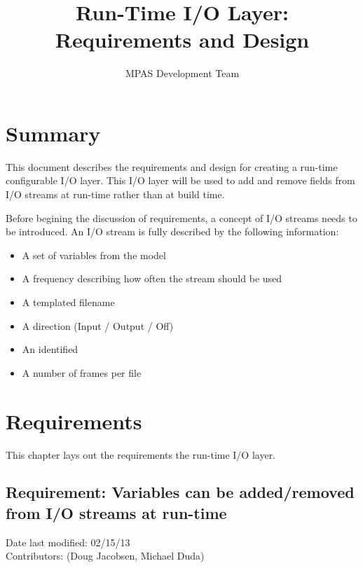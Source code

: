 \documentclass[11pt]{report}
\begin{document}
\title{Run-Time I/O Layer: \\
Requirements and Design}
\author{MPAS Development Team}

\maketitle
\tableofcontents


\chapter{Summary}

This document describes the requirements and design for creating a run-time
configurable I/O layer.  This I/O layer will be used to add and remove fields
from I/O streams at run-time rather than at build time. 

Before begining the discussion of requirements, a concept of I/O streams needs
to be introduced. An I/O stream is fully described by the following information:

\begin{itemize}
	\item A set of variables from the model
	\item A frequency describing how often the stream should be used
	\item A templated filename
	\item A direction (Input / Output / Off)
	\item An identified
	\item A number of frames per file
\end{itemize}


\chapter{Requirements}

This chapter lays out the requirements the run-time I/O layer.
\section{Requirement: Variables can be added/removed from I/O streams at run-time}
Date last modified: 02/15/13 \\
Contributors: (Doug Jacobsen, Michael Duda) \\
\end{document}
